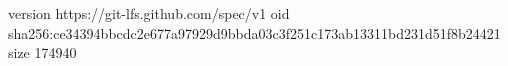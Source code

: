 version https://git-lfs.github.com/spec/v1
oid sha256:ce34394bbcdc2e677a97929d9bbda03c3f251c173ab13311bd231d51f8b24421
size 174940
